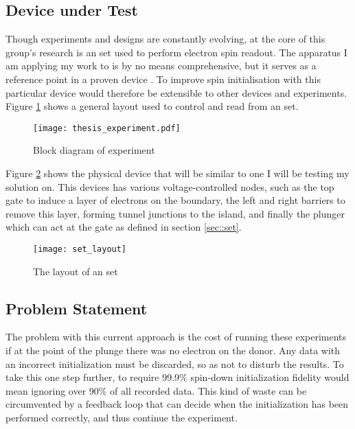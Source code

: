 \subsection{Device under Test}
\label{sec::experiment}
Though experiments and designs are constantly evolving, at the core of this group's research is an \gls{set} used to perform electron spin readout. The apparatus I am applying my work to is by no means comprehensive, but it serves as a reference point in a proven device \cite{morello2010single}. To improve spin initialisation with this particular device would therefore be extensible to other devices and experiments.
Figure \ref{fig::thesis_experiment} shows a general layout used to control and read from an \gls{set}.

\begin{figure}[htbp!]
	\centering
	\texttt{[image: thesis\_experiment.pdf]}
	\caption{Block diagram of experiment}
	\label{fig::thesis_experiment}
\end{figure}


Figure \ref{fig::set_layout} shows the physical device that will be similar to one I will be testing my solution on. This devices has various voltage-controlled nodes, such as the top gate to induce a layer of electrons on the boundary, the left and right barriers to remove this layer, forming tunnel junctions to the island, and finally the plunger which can act at the gate as defined in section \ref{sec::set}.

\begin{figure}[htbp!]
	\centering
	\texttt{[image: set\_layout]}
	\caption[Layout of an \gls{set}]{The layout of an \gls{set}\cite{morello2010single}}
	\label{fig::set_layout}
\end{figure}

\subsection{Problem Statement}
The problem with this current approach is the cost of running these experiments if at the point of the plunge there was no electron on the donor. Any data with an incorrect initialization must be discarded, so as not to disturb the results. To take this one step further, to require 99.9\% spin-down initialization fidelity would mean ignoring over 90\% of all recorded data. This kind of waste can be circumvented by a feedback loop that can decide when the initialization has been performed correctly, and thus continue the experiment.

